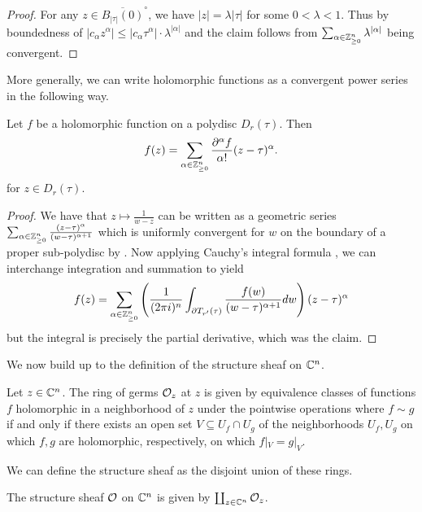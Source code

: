 \begin{proof}
    For any $z\in \overline{B_{|\tau|}(0)}^{\circ}$, we have $|z|=\lambda|\tau|$ for some $0<\lambda<1$. Thus by boundedness of $|c_{\alpha}z^{\alpha}|\leq|c_{\alpha}\tau^{\alpha}|\cdot\lambda^{|\alpha|}$ and the claim follows from $\sum_{\alpha\in\mathbb{Z}_{\geq0}^{n}}\lambda^{|\alpha|}$ being convergent. 
\end{proof}
More generally, we can write holomorphic functions as a convergent power series in the following way. 
\begin{theorem}\label{thm: power series expansion of holomorphic functions}
    Let $f$ be a holomorphic function on a polydisc $D_{r}(\tau)$. Then 
    $$f(z)=\sum_{\alpha\in\mathbb{Z}_{\geq0}^{n}}\frac{\partial^{\alpha}f}{\alpha!}(z-\tau)^{\alpha}.$$
    for $z\in D_{r}(\tau)$.
\end{theorem}
\begin{proof}
    We have that $z\mapsto\frac{1}{w - z}$ can be written as a geometric series $\sum_{\alpha\in\mathbb{Z}_{\geq0}^{n}}\frac{(z-\tau)^{\alpha}}{(w-\tau)^{\alpha+1}}$ which is uniformly convergent for $w$ on the boundary of a proper sub-polydisc by . Now applying Cauchy's integral formula , we can interchange integration and summation to yield 
    $$f(z)=\sum_{\alpha\in\mathbb{Z}_{\geq0}^{n}}\left(\frac{1}{(2\pi i)^{n}}\int_{\partial T_{r'}(\tau)}\frac{f(w)}{(w-\tau)^{\alpha+1}}dw\right)(z-\tau)^{\alpha}$$ 
    but the integral is precisely the partial derivative, which was the claim. 
\end{proof}
We now build up to the definition of the structure sheaf on $\mathbb{C}^{n}$. 
\begin{definition}\label{def: germ}
    Let $z\in\mathbb{C}^{n}$. The ring of germs $\mathcal{O}_{z}$ at $z$ is given by equivalence classes of functions $f$ holomorphic in a neighborhood of $z$ under the pointwise operations where $f\sim g$ if and only if there exists an open set $V\subseteq U_{f}\cap U_{g}$ of the neighborhoods $U_{f},U_{g}$ on which $f,g$ are holomorphic, respectively, on which $f|_{V}=g|_{V}$.
\end{definition}
We can define the structure sheaf as the disjoint union of these rings. 
\begin{definition}\label{def: structure sheaf}
    The structure sheaf $\mathcal{O}$ on $\mathbb{C}^{n}$ is given by $\coprod_{z\in\mathbb{C}^{n}}\mathcal{O}_{z}$. 
\end{definition}
